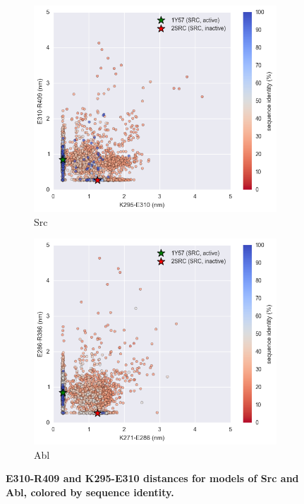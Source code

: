 \documentclass[aps,pre,twocolumn,nofootinbib,superscriptaddress,linenumbers]{revtex4-1}
\begin{document}
\begin{figure}
  \centering
    \begin{subfigure}[b]{0.45\textwidth}
      \includegraphics[width=1.0\textwidth]{residue_pair_distances/src/distances}
      \caption{Src}
    \end{subfigure}
    \begin{subfigure}[b]{0.45\textwidth}
      \includegraphics[width=1.0\textwidth]{residue_pair_distances/abl/distances}
      \caption{Abl}
    \end{subfigure}
    \caption{{\bf E310-R409 and K295-E310 distances for models of Src and Abl, colored by sequence identity.}
  }
  \label{figaa_pair_distances_ref_structures}
\end{figure}
\end{document}
